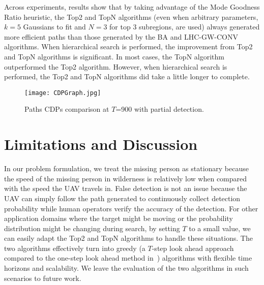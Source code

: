 Across experiments, results show that by taking advantage of the Mode Goodness Ratio heuristic, the Top2 and TopN algorithms (even when arbitrary parameters, $k=5$ Gaussians to fit and $N=3$ for top 3 subregions, are used) always generated more efficient paths than those generated by the BA and LHC-GW-CONV algorithms. When hierarchical search is performed, the improvement from Top2 and TopN algorithms is significant. In most cases, the TopN algorithm outperformed the Top2 algorithm. However, when hierarchical search is performed, the Top2 and TopN algorithms did take a little longer to complete.
\begin{figure}
\centering
\texttt{[image: CDPGraph.jpg]}
\caption{Paths CDPs comparison at $T$=900 with partial detection.}
\label{CDPGraph}
\end{figure}




\section{Limitations and Discussion}
\label{sec:LimitationsAndDiscussion}

In our problem formulation, we treat the missing person as stationary because the speed of the missing person in wilderness is relatively low when compared with the speed the UAV travels in. False detection is not an issue because the UAV can simply follow the path generated to continuously collect detection probability while human operators verify the accuracy of the detection. For other application domains where the target might be moving or the probability distribution might be changing during search, by setting $T$ to a small value, we can easily adapt the Top2 and TopN algorithms to handle these situations. The two algorithms effectively turn into greedy (a $T$-step look ahead approach compared to the one-step look ahead method in~\cite{Bourgault2006Optimal}) algorithms with flexible time horizons and scalability. We leave the evaluation of the two algorithms in such scenarios to future work.


